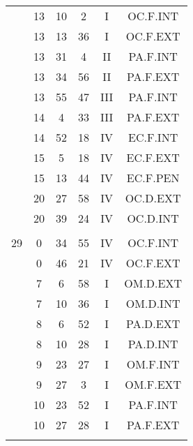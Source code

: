 \documentclass[12pt, a4paper]{article}
\begin{document}
\begin{multicols}{3}
{\begin{tabular}{c c c c c c}
	 	 	 	 & 13 & 10 & 2 & I & OC.F.INT\\%
	 	 	 	 & 13 & 13 & 36 & I & OC.F.EXT\\%
	 	 	 	 & 13 & 31 & 4 & II & PA.F.INT\\%
	 	 	 	 & 13 & 34 & 56 & II & PA.F.EXT\\%
	 	 	 	 & 13 & 55 & 47 & III & PA.F.INT\\%
	 	 	 	 & 14 & 4 & 33 & III & PA.F.EXT\\%
	 	 	 	 & 14 & 52 & 18 & IV & EC.F.INT\\%
	 	 	 	 & 15 & 5 & 18 & IV & EC.F.EXT\\%
	 	 	 	 & 15 & 13 & 44 & IV & EC.F.PEN\\%
	 	 	 	 & 20 & 27 & 58 & IV & OC.D.EXT\\%
	 	 	 	 & 20 & 39 & 24 & IV & OC.D.INT\\%
	 	 	 	 & & & & & \\%
	 	 	 	29 & 0 & 34 & 55 & IV & OC.F.INT\\%
	 	 	 	 & 0 & 46 & 21 & IV & OC.F.EXT\\%
	 	 	 	 & 7 & 6 & 58 & I & OM.D.EXT\\%
	 	 	 	 & 7 & 10 & 36 & I & OM.D.INT\\%
	 	 	 	 & 8 & 6 & 52 & I & PA.D.EXT\\%
	 	 	 	 & 8 & 10 & 28 & I & PA.D.INT\\%
	 	 	 	 & 9 & 23 & 27 & I & OM.F.INT\\%
	 	 	 	 & 9 & 27 & 3 & I & OM.F.EXT\\%
	 	 	 	 & 10 & 23 & 52 & I & PA.F.INT\\%
	 	 	 	 & 10 & 27 & 28 & I & PA.F.EXT\\%
	 	 	 	 & & & & & \\%

\end{tabular}}
\end{multicols}
\end{document}

